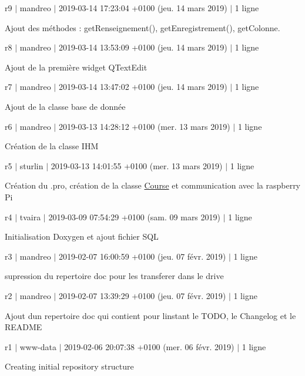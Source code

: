r9 $\vert$ mandreo $\vert$ 2019-\/03-\/14 17\+:23\+:04 +0100 (jeu. 14 mars 2019) $\vert$ 1 ligne

Ajout des méthodes \+: get\+Renseignement(), get\+Enregistrement(), get\+Colonne.

r8 $\vert$ mandreo $\vert$ 2019-\/03-\/14 13\+:53\+:09 +0100 (jeu. 14 mars 2019) $\vert$ 1 ligne

Ajout de la première widget Q\+Text\+Edit

r7 $\vert$ mandreo $\vert$ 2019-\/03-\/14 13\+:47\+:02 +0100 (jeu. 14 mars 2019) $\vert$ 1 ligne

Ajout de la classe base de donnée

r6 $\vert$ mandreo $\vert$ 2019-\/03-\/13 14\+:28\+:12 +0100 (mer. 13 mars 2019) $\vert$ 1 ligne

Création de la classe I\+HM

r5 $\vert$ sturlin $\vert$ 2019-\/03-\/13 14\+:01\+:55 +0100 (mer. 13 mars 2019) $\vert$ 1 ligne

Création du .pro, création de la classe \hyperlink{class_course}{Course} et communication avec la raspberry Pi

r4 $\vert$ tvaira $\vert$ 2019-\/03-\/09 07\+:54\+:29 +0100 (sam. 09 mars 2019) $\vert$ 1 ligne

Initialisation Doxygen et ajout fichier S\+QL

r3 $\vert$ mandreo $\vert$ 2019-\/02-\/07 16\+:00\+:59 +0100 (jeu. 07 févr. 2019) $\vert$ 1 ligne

supression du repertoire doc pour les transferer dans le drive

r2 $\vert$ mandreo $\vert$ 2019-\/02-\/07 13\+:39\+:29 +0100 (jeu. 07 févr. 2019) $\vert$ 1 ligne

Ajout d\textquotesingle{}un repertoire doc qui contient pour l\textquotesingle{}instant le T\+O\+DO, le Changelog et le R\+E\+A\+D\+ME

r1 $\vert$ www-\/data $\vert$ 2019-\/02-\/06 20\+:07\+:38 +0100 (mer. 06 févr. 2019) $\vert$ 1 ligne

Creating initial repository structure 